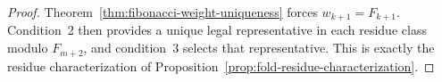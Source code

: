 \begin{proof}
Theorem~\ref{thm:fibonacci-weight-uniqueness} forces \(w_{k+1}=F_{k+1}\).
Condition~2 then provides a unique legal representative in each residue class
modulo \(F_{m+2}\), and condition~3 selects that representative. This is
exactly the residue characterization of
Proposition~\ref{prop:fold-residue-characterization}.
\end{proof}
